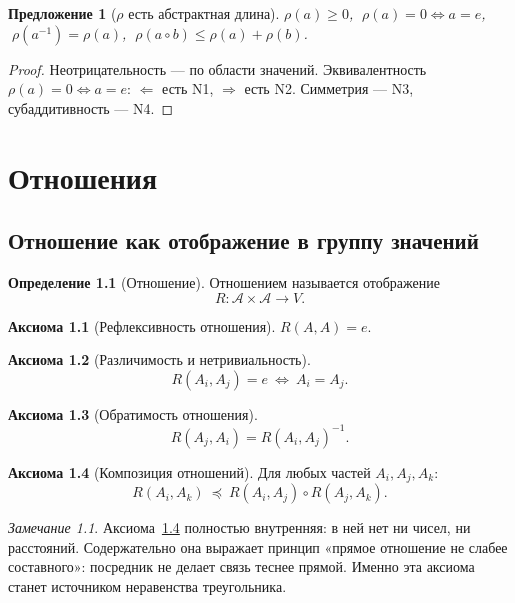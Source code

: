 \documentclass[12pt,a4paper,oneside]{book}
\theoremstyle{definition}
\newtheorem{axiom}{Аксиома}[chapter]
\newtheorem{definition}{Определение}[chapter]
\theoremstyle{plain}
\newtheorem{proposition}{Предложение}[chapter]
\theoremstyle{remark}
\newtheorem{remark}{Замечание}[chapter]
\newcommand{\Parts}{\mathcal A}
\newcommand{\Rel}{R}
\newcommand{\Values}{V}
\newcommand{\comp}{\circ}
\newcommand{\Vord}{\preceq}
\newcommand{\norm}{\rho}
\newcommand{\ide}{e}
\begin{document}
\begin{proposition}[$\norm$ есть абстрактная длина]
$\norm(a)\ge0$, $\;\norm(a)=0\iff a=\ide$, $\;\norm(a^{-1})=\norm(a)$,
$\;\norm(a\comp b)\le\norm(a)+\norm(b)$.
\end{proposition}

\begin{proof}
Неотрицательность --- по области значений. Эквивалентность $\norm(a)=0\iff a=\ide$:
$\Leftarrow$ есть N1, $\Rightarrow$ есть N2. Симметрия --- N3, субаддитивность --- N4.
\end{proof}

\chapter{Отношения}

\section{Отношение как отображение в группу значений}

\begin{definition}[Отношение]
Отношением называется отображение
\[
\Rel:\Parts\times\Parts\to\Values.
\]
\end{definition}

\begin{axiom}[Рефлексивность отношения]
$\Rel(A,A)=\ide$.
\end{axiom}

\begin{axiom}[Различимость и нетривиальность]\label{ax:nontrivial}
\[
\Rel(A_i,A_j)=\ide\ \Longleftrightarrow\ A_i=A_j.
\]
\end{axiom}

\begin{axiom}[Обратимость отношения]\label{ax:invol}
\[
\Rel(A_j,A_i)=\Rel(A_i,A_j)^{-1}.
\]
\end{axiom}

\begin{axiom}[Композиция отношений]\label{ax:compose}
Для любых частей $A_i,A_j,A_k$:
\[
\Rel(A_i,A_k)\ \Vord\ \Rel(A_i,A_j)\comp\Rel(A_j,A_k).
\]
\end{axiom}

\begin{remark}
Аксиома~\ref{ax:compose} полностью внутренняя: в ней нет ни чисел, ни расстояний.
Содержательно она выражает принцип «прямое отношение не слабее составного»: посредник
не делает связь теснее прямой. Именно эта аксиома станет источником неравенства
треугольника.
\end{remark}
\end{document}
